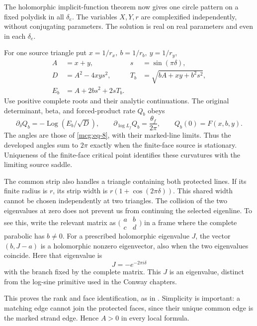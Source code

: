 The holomorphic implicit-function theorem now gives one circle pattern
on a fixed polydisk in all \(\delta_e\). The variables \(X,Y,r\) are
complexified independently, without conjugating parameters. The solution
is real on real parameters and even in each \(\delta_e\).

For one source triangle put \(x=1/r_x,\ b=1/r_b,\ y=1/r_y\), \begin{equation}\label{mcg:eq-9}
\begin{aligned}
A&=x+y,& s&=\sin(\pi\delta),\\
D&=A^2-4xy s^2,&
T_b&=\sqrt{bA+xy+b^2s^2},\\
E_b&=A+2bs^2+2sT_b .
\end{aligned}
\end{equation} Use positive complete roots and their analytic continuations. The
original determinant, beta, and forced-product rate \(Q_b\) obeys \begin{equation}\label{mcg:eq-10}
\partial_\delta Q_b=-\operatorname{Log}(E_b/\sqrt D),
\qquad
\partial_{\log L_f}Q_b=\frac{\theta_f}{2\pi},
\qquad Q_b(0)=F(x,b,y).
\end{equation} The angles are those of \eqref{mcg:eq-8}, with their marked-line
limits. Thus the developed angles sum to \(2\pi\) exactly when the
finite-face source is stationary. Uniqueness of the finite-face critical
point identifies these curvatures with the limiting source saddle.

The common strip also handles a triangle containing both protected
lines. If its finite radius is \(r\), its strip width is
\(r(1+\cos(2\pi\delta))\). This shared width cannot be chosen
independently at two triangles. The collision of the two eigenvalues at zero does not prevent us
from continuing the selected eigenline. To see this, write the relevant
matrix as $\bigl(\begin{smallmatrix}a&b\\c&d\end{smallmatrix}\bigr)$
in a frame where the complete parabolic has $b\ne0$. For a prescribed
holomorphic eigenvalue $J$, the vector $(b,J-a)$ is a holomorphic
nonzero eigenvector, also when the two eigenvalues coincide. Here that
eigenvalue is
\begin{equation}\label{mcg:eq-11}
J=-e^{-2\pi i\delta}
\end{equation} with the branch fixed by the complete matrix. This $J$ is an
eigenvalue, distinct from the log-sine primitive used in the Conway
chapters.

This proves the rank and face identification, as in
\cite[Section~3]{MarkedFillings}. Simplicity is important: a matching
edge cannot join the protected faces, since their unique common edge
is the marked strand edge. Hence \(A>0\) in every local formula.

